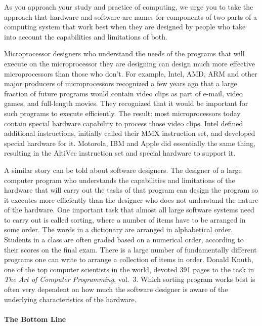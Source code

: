 \documentclass{patt}
\begin{document}
As you approach your study and practice of computing, we urge you to take 
the approach that hardware and software are names for components of
two parts of a computing system that work best when they are designed by
people who take into account the capabilities and limitations of both.

Microprocessor designers who understand the needs of the programs that will
execute on the microprocessor they are designing can design much more
effective microprocessors than those who don't.  For example, Intel, AMD, 
ARM and other major producers of microprocessors recognized a
few years ago that a large fraction of future programs would contain video
clips as part of e-mail, video games, and full-length movies.  They
recognized that it would be important for such programs to execute 
efficiently.  The result: most microprocessors today contain special 
hardware capability to process those video clips.  Intel defined 
additional instructions, initially called their MMX instruction set,
and developed special hardware for it.  Motorola, IBM and Apple did 
essentially the same thing, resulting in the AltiVec instruction set and
special hardware to support it.  

A similar story can be told about software designers.
The designer of a large computer program who understands the capabilities
and limitations of the hardware that will carry out the tasks of that program
can design the program so it executes more efficiently than the designer 
who does not 
understand the nature of the hardware.  One important task that almost all
large software systems need to carry out is called sorting, where a number of
items have to be arranged in some order.  The words in a dictionary are
arranged in alphabetical order.  Students in a class are often graded based 
on a numerical order, according to their scores on the final exam.  There is 
a large number of fundamentally different programs one can write to arrange a 
collection of items in order.  Donald Knuth, one of the top computer 
scientists in the world, devoted 391 pages to the task in 
{\em The Art of Computer Programming}, vol.~3.  Which sorting program works 
best is often very dependent on how much the software designer is aware of 
the underlying characteristics of the hardware.

\vspace{-12pt}
\paragraph{The Bottom Line}
\end{document}
